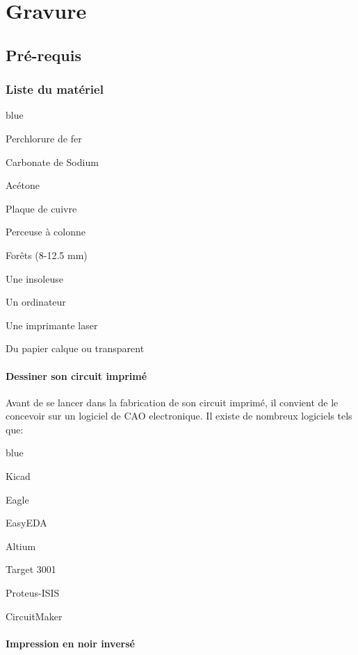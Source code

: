 
\part{Gravure}

\chapter{Pré-requis}

\section{Liste du matériel}

\begin{items}{blue}{\Bullet}
	\item Perchlorure de fer
	\item Carbonate de Sodium
	\item Acétone
	\item Plaque de cuivre 
	\item Perceuse à colonne
	\item Forêts (8-12.5 mm)
	\item Une insoleuse
	\item Un ordinateur
	\item Une imprimante laser
	\item Du papier calque ou transparent
\end{items}

\subsection{Dessiner son circuit imprimé}

Avant de se lancer dans la fabrication de son circuit imprimé, il convient de le concevoir sur un logiciel de CAO electronique.
Il existe de nombreux logiciels tels que:

\begin{items}{blue}{\Bullet}
	\item Kicad
	\item Eagle
	\item EasyEDA
	\item Altium 
	\item Target 3001
	\item Proteus-ISIS
	\item CircuitMaker
\end{items}

\subsection{Impression en noir inversé}


